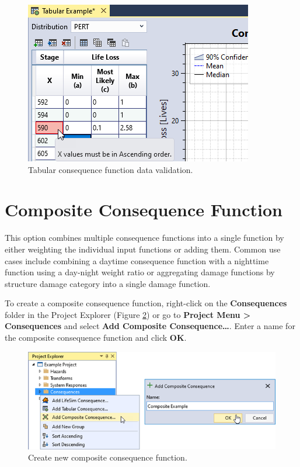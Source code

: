 \documentclass[
]{book}
\begin{document}
\begin{figure}

{\centering \includegraphics{images/figure119} 

}

\caption{Tabular consequence function data validation.}\label{fig:figure-119}
\end{figure}

\hypertarget{composite-consequence-function}{%
\section{Composite Consequence Function}\label{composite-consequence-function}}

This option combines multiple consequence functions into a single function by either weighting the individual input functions or adding them. Common use cases include combining a daytime consequence function with a nighttime function using a day-night weight ratio or aggregating damage functions by structure damage category into a single damage function.

To create a composite consequence function, right-click on the \textbf{Consequences} folder in the Project Explorer (Figure \ref{fig:figure-120}) or go to \textbf{Project Menu \textgreater{} Consequences} and select \textbf{Add Composite Consequence\ldots{}}. Enter a name for the composite consequence function and click \textbf{OK}.

\begin{figure}

{\centering \includegraphics{images/figure120} 

}

\caption{Create new composite consequence function.}\label{fig:figure-120}
\end{figure}
\end{document}
